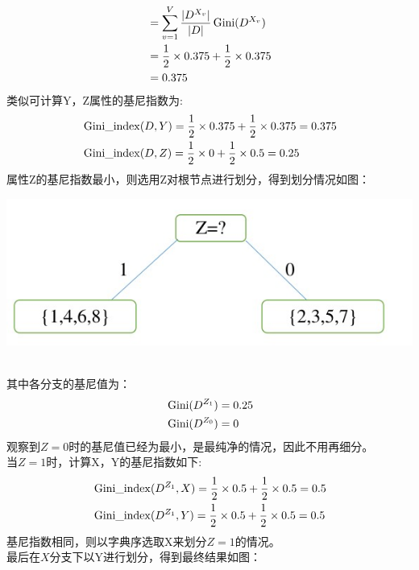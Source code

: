 \documentclass[answers]{exam}  %
\begin{document}
\begin{questions}
\begin{solution}
$$\begin{aligned}
            &=\sum^V_{v=1}\frac{|D^{X_v}|}{|D|}\operatornamewithlimits{Gini}(D^{X_v})\\
            &=\frac12\times 0.375 + \frac12\times 0.375\\
            &=0.375\\
        \end{aligned}
        $$
        类似可计算Y，Z属性的基尼指数为:
        $$
        \begin{aligned}
            &\operatornamewithlimits{Gini\_index}(D,Y)=\frac12\times0.375+\frac12\times0.375=0.375\\
            &\operatornamewithlimits{Gini\_index}(D,Z)=\frac12\times0+\frac12\times 0.5=0.25\\
        \end{aligned}
        $$
        属性Z的基尼指数最小，则选用Z对根节点进行划分，得到划分情况如图：\\
        \centerline{\includegraphics[width=0.7\linewidth]{Z.jpg}}\\
        其中各分支的基尼值为：\\
        $$
        \begin{aligned}
            &\operatornamewithlimits{Gini}(D^{Z_1})=0.25\\
            &\operatornamewithlimits{Gini}(D^{Z_0})=0\\
        \end{aligned}
        $$
        观察到$Z=0$时的基尼值已经为最小，是最纯净的情况，因此不用再细分。\\
        当$Z=1$时，计算X，Y的基尼指数如下:\\
        $$
        \begin{aligned}
            &\operatornamewithlimits{Gini\_index}(D^{Z_1},X)=\frac12\times0.5+\frac12\times0.5=0.5\\
            &\operatornamewithlimits{Gini\_index}(D^{Z_1},Y)=\frac12\times0.5+\frac12\times 0.5=0.5\\
        \end{aligned}
        $$
        基尼指数相同，则以字典序选取X来划分$Z=1$的情况。\\
        最后在$X$分支下以Y进行划分，得到最终结果如图：\\

\end{solution}
\end{questions}
\end{document}
